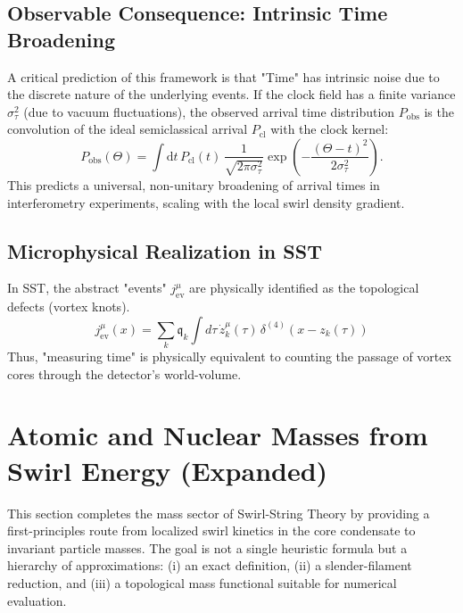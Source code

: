 \documentclass[10pt]{article}
\begin{document}
    \subsection{Observable Consequence: Intrinsic Time Broadening}
        A critical prediction of this framework is that "Time" has intrinsic noise due to the discrete nature of the underlying events.
        If the clock field has a finite variance $\sigma_\tau^2$ (due to vacuum fluctuations), the observed arrival time distribution $P_{\mathrm{obs}}$ is the convolution of the ideal semiclassical arrival $P_{\mathrm{cl}}$ with the clock kernel:
        \begin{equation}
            P_{\mathrm{obs}}(\Theta) = \int \mathrm{d}t \, P_{\mathrm{cl}}(t) \, \frac{1}{\sqrt{2\pi\sigma_\tau^2}} \exp\left( -\frac{(\Theta - t)^2}{2\sigma_\tau^2} \right).
        \end{equation}
        This predicts a universal, non-unitary broadening of arrival times in interferometry experiments, scaling with the local swirl density gradient.

    \subsection{Microphysical Realization in SST}
        In SST, the abstract "events" $j_{\mathrm{ev}}^\mu$ are physically identified as the topological defects (vortex knots).
        \begin{equation}
            j_{\mathrm{ev}}^\mu(x) = \sum_{k} \mathfrak{q}_k \int d\tau \, \dot{z}_k^\mu(\tau) \, \delta^{(4)}(x - z_k(\tau))
        \end{equation}
        Thus, "measuring time" is physically equivalent to counting the passage of vortex cores through the detector's world-volume.
    \section{Atomic and Nuclear Masses from Swirl Energy (Expanded)}
    \label{sec:mass_expanded}

    This section completes the mass sector of Swirl-String Theory by providing a
    first-principles route from localized swirl kinetics in the core condensate to
    invariant particle masses. The goal is not a single heuristic formula but a
    hierarchy of approximations: (i) an exact definition, (ii) a slender-filament
    reduction, and (iii) a topological mass functional suitable for numerical
    evaluation.
\end{document}
